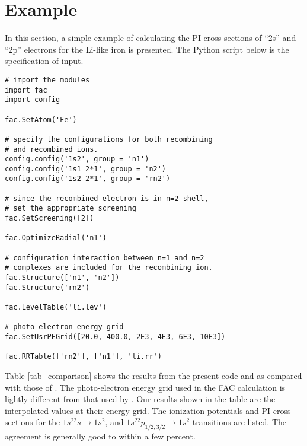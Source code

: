 \documentclass{elsart}
\begin{document}
\section{Example}
\label{sec_example}
In this section, a simple example of calculating the PI cross sections of
``2s'' and ``2p'' electrons for the Li-like iron is presented. The Python
script below is the specification of input.
\begin{verbatim}
# import the modules
import fac
import config

fac.SetAtom('Fe')

# specify the configurations for both recombining 
# and recombined ions.
config.config('1s2', group = 'n1')
config.config('1s1 2*1', group = 'n2')
config.config('1s2 2*1', group = 'rn2')

# since the recombined electron is in n=2 shell, 
# set the appropriate screening
fac.SetScreening([2])

fac.OptimizeRadial('n1')

# configuration interaction between n=1 and n=2 
# complexes are included for the recombining ion.
fac.Structure(['n1', 'n2'])
fac.Structure('rn2')

fac.LevelTable('li.lev')

# photo-electron energy grid
fac.SetUsrPEGrid([20.0, 400.0, 2E3, 4E3, 6E3, 10E3])

fac.RRTable(['rn2'], ['n1'], 'li.rr')
\end{verbatim}

Table \ref{tab_comparison} shows the results from the present code and
as compared with those of
\citet{zhang98}. The photo-electron energy grid used in the FAC calculation
is lightly different from that used by \citet{zhang98}. Our results shown in
the table are the 
interpolated values at their energy grid. The ionization potentials and PI
cross sections for the $1s^22s$$\rightarrow$$1s^2$, and
$1s^22p_{1/2,3/2}$$\rightarrow$$1s^2$ transitions are listed. The agreement is
generally good to within a few percent.
\end{document}

